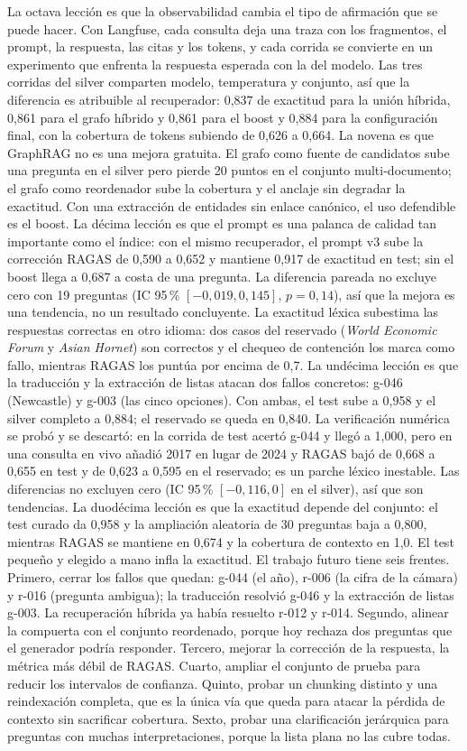 La octava lecci\'on es que la observabilidad cambia el tipo de afirmaci\'on que se puede hacer. Con Langfuse, cada consulta deja una traza con los fragmentos, el prompt, la respuesta, las citas y los tokens, y cada corrida se convierte en un experimento que enfrenta la respuesta esperada con la del modelo. Las tres corridas del silver comparten modelo, temperatura y conjunto, as\'i que la diferencia es atribuible al recuperador: 0,837 de exactitud para la uni\'on h\'ibrida, 0,861 para el grafo h\'ibrido y 0,861 para el boost y 0,884 para la configuraci\'on final, con la cobertura de tokens subiendo de 0,626 a 0,664. La novena es que GraphRAG no es una mejora gratuita. El grafo como fuente de candidatos sube una pregunta en el silver pero pierde 20 puntos en el conjunto multi-documento; el grafo como reordenador sube la cobertura y el anclaje sin degradar la exactitud. Con una extracci\'on de entidades sin enlace can\'onico, el uso defendible es el boost. La d\'ecima lecci\'on es que el prompt es una palanca de calidad tan importante como el \'indice: con el mismo recuperador, el prompt v3 sube la correcci\'on RAGAS de 0,590 a 0,652 y mantiene 0,917 de exactitud en test; sin el boost llega a 0,687 a costa de una pregunta. La diferencia pareada no excluye cero con 19 preguntas (IC 95\,\% $[-0{,}019, 0{,}145]$, $p=0{,}14$), as\'i que la mejora es una tendencia, no un resultado concluyente. La exactitud l\'exica subestima las respuestas correctas en otro idioma: dos casos del reservado (\textit{World Economic Forum} y \textit{Asian Hornet}) son correctos y el chequeo de contenci\'on los marca como fallo, mientras RAGAS los punt\'ua por encima de 0,7. La und\'ecima lecci\'on es que la traducci\'on y la extracci\'on de listas atacan dos fallos concretos: g-046 (Newcastle) y g-003 (las cinco opciones). Con ambas, el test sube a 0,958 y el silver completo a 0,884; el reservado se queda en 0,840. La verificaci\'on num\'erica se prob\'o y se descart\'o: en la corrida de test acert\'o g-044 y lleg\'o a 1,000, pero en una consulta en vivo a\~nadi\'o 2017 en lugar de 2024 y RAGAS baj\'o de 0,668 a 0,655 en test y de 0,623 a 0,595 en el reservado; es un parche l\'exico inestable. Las diferencias no excluyen cero (IC 95\,\% $[-0{,}116, 0]$ en el silver), as\'i que son tendencias. La duod\'ecima lecci\'on es que la exactitud depende del conjunto: el test curado da 0,958 y la ampliaci\'on aleatoria de 30 preguntas baja a 0,800, mientras RAGAS se mantiene en 0,674 y la cobertura de contexto en 1,0. El test peque\~no y elegido a mano infla la exactitud. El trabajo futuro tiene seis frentes. Primero, cerrar los fallos que quedan: g-044 (el a\~no), r-006 (la cifra de la c\'amara) y r-016 (pregunta ambigua); la traducci\'on resolvi\'o g-046 y la extracci\'on de listas g-003. La recuperaci\'on h\'ibrida ya hab\'ia resuelto r-012 y r-014. Segundo, alinear la compuerta con el conjunto reordenado, porque hoy rechaza dos preguntas que el generador podr\'ia responder. Tercero, mejorar la correcci\'on de la respuesta, la m\'etrica m\'as d\'ebil de RAGAS. Cuarto, ampliar el conjunto de prueba para reducir los intervalos de confianza. Quinto, probar un chunking distinto y una reindexaci\'on completa, que es la \'unica v\'ia que queda para atacar la p\'erdida de contexto sin sacrificar cobertura. Sexto, probar una clarificaci\'on jer\'arquica para preguntas con muchas interpretaciones, porque la lista plana no las cubre todas.
